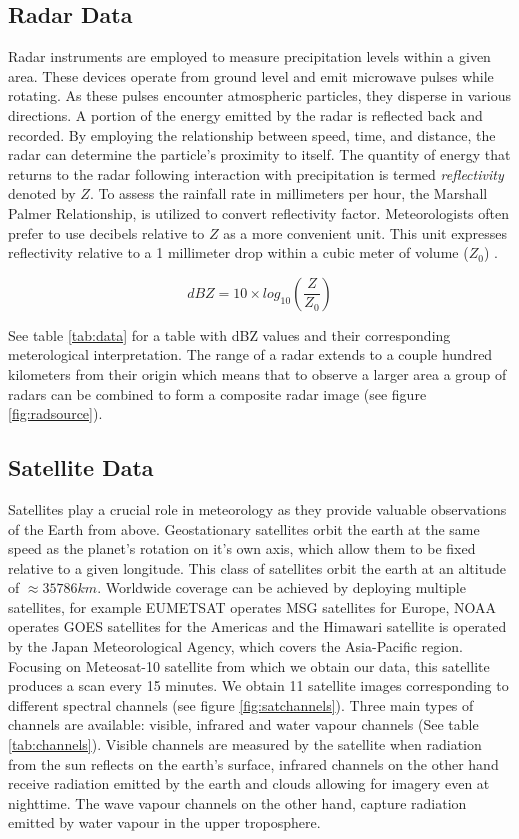 \subsection{Radar Data}
Radar instruments are employed to measure precipitation levels within a given area.
These devices operate from ground level and emit microwave pulses while rotating.
As these pulses encounter atmospheric particles, they disperse in various directions.
A portion of the energy emitted by the radar is reflected back and recorded.
By employing the relationship between speed, time, and distance, the radar can determine the particle's proximity to itself.
The quantity of energy that returns to the radar following interaction with precipitation is termed \textit{reflectivity} denoted by $Z$.
To assess the rainfall rate in millimeters per hour, the Marshall Palmer Relationship, \cite{marshall-1948} is utilized to convert reflectivity factor.
Meteorologists often prefer to use decibels relative to $Z$ as a more convenient unit.
This unit expresses reflectivity relative to a 1 millimeter drop within a cubic meter of volume ($Z_0$) \cite{rogers-1976}.

\begin{equation}
  dBZ = 10 \times log_{10}(\frac{Z}{Z_0})
\end{equation}

See table \ref{tab:data} for a table with dBZ values and their corresponding meterological interpretation.
The range of a radar extends to a couple hundred kilometers from their origin which means that to observe a larger area a group of radars
can be combined to form a composite radar image (see figure \ref{fig:radsource}). 


\subsection{Satellite Data}
Satellites play a crucial role in meteorology as they provide valuable observations of the Earth from above.
Geostationary satellites orbit the earth at the same speed as the planet's rotation on it's own axis, which allow them to be fixed relative to a given longitude.
This class of satellites orbit the earth at an altitude of $\approx 35786 km$.
Worldwide coverage can be achieved by deploying multiple satellites, for example EUMETSAT operates MSG satellites for Europe, NOAA operates GOES satellites for the Americas and the Himawari satellite is operated by the Japan Meteorological Agency, which covers the Asia-Pacific region.
Focusing on Meteosat-10 satellite from which we obtain our data, this satellite produces a scan every 15 minutes.
We obtain 11 satellite images corresponding to different spectral channels (see figure \ref{fig:satchannels}). Three main types of channels are available: visible, infrared and water vapour channels (See table \ref{tab:channels}). 
Visible channels are measured by the satellite when radiation from the sun reflects on the earth's surface, infrared channels on the other hand receive radiation emitted by the earth and clouds allowing for imagery even at nighttime. The wave vapour channels on the other hand, capture radiation emitted
by water vapour in the upper troposphere.
